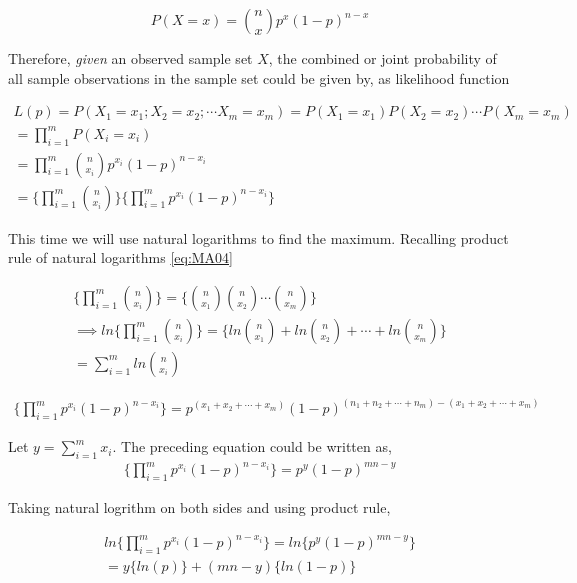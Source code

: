 \documentclass[float=false,crop=false]{standalone}
\begin{document}
\[
P(X = x) = {n \choose x}p^{x}(1-p)^{n-x}
\]

Therefore, \emph{given} an observed sample set \(X\), the combined or
joint probability of all sample observations in the sample set could be
given by, as likelihood function

    \begin{equation}
\begin{aligned}
L(p) = P(X_1 = x_1; X_2 = x_2; \cdots X_m=x_m) = P(X_1 = x_1)P(X_2 = x_2)\cdots P(X_m=x_m) \\
= \prod_{i=1}^{m} P(X_i= x_i) \\
= \prod_{i=1}^{m} {n \choose x_i}p^{x_i}(1-p)^{n-x_i} \\
= \Bigg\{ \prod_{i=1}^{m}{n \choose x_i} \Bigg\}\Bigg\{ \prod_{i=1}^{m}p^{x_i}(1-p)^{n-x_i} \Bigg\} \label{eq:M005}
\end{aligned}
\end{equation}

    This time we will use natural logarithms to find the maximum. Recalling
product rule of natural logarithms \ref{eq:MA04}

\begin{equation}
\begin{aligned}
\Bigg\{ \prod_{i=1}^{m}{n \choose x_i} \Bigg\} = \Bigg\{ {n \choose x_1}{n \choose x_2}\cdots{n \choose x_m} \Bigg\} \\
\implies ln\Bigg\{ \prod_{i=1}^{m}{n \choose x_i} \Bigg\} = \Bigg\{ ln{n \choose x_1} + ln{n \choose x_2} + \cdots + ln{n \choose x_m} \Bigg\} \\
= \sum\limits_{i=1}^m{ln{n \choose x_i}} \label{eq:M006}
\end{aligned}
\end{equation}

    \[
\begin{aligned}
    \Bigg\{ \prod_{i=1}^{m}p^{x_i}(1-p)^{n-x_i} \Bigg\} = p^{(x_1+x_2+\cdots+x_m)}(1-p)^{(n_1+n_2+\cdots+n_m) - (x_1+x_2+\cdots+x_m) } \nonumber
\end{aligned}
\]

Let \(y = \sum\limits_{i=1}^{m}x_i\). The preceding equation could be
written as, \[
\begin{aligned}
     \Bigg\{ \prod_{i=1}^{m}p^{x_i}(1-p)^{n-x_i} \Bigg\} = p^y(1-p)^{mn - y}
\end{aligned}
\]

Taking natural logrithm on both sides and using product rule,

\begin{equation}
\begin{aligned}
    ln \Bigg\{ \prod_{i=1}^{m}p^{x_i}(1-p)^{n-x_i} \Bigg\} = ln \Big\{p^y(1-p)^{mn - y} \Big\} \\
    = y \Big\{ln(p)\Big\} + (mn-y)\Big\{ln(1-p)\Big\} \label{eq:M007}
\end{aligned}
\end{equation}
\end{document}
